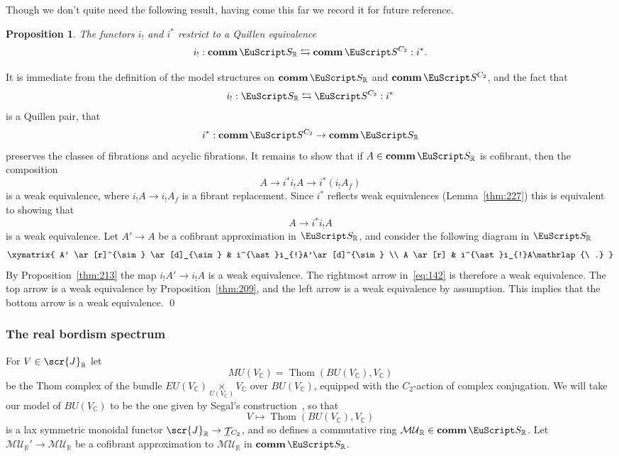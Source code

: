 \documentclass{amsart}
\newtheorem{prop}[equation]{Proposition}
\theoremstyle{definition}
\theoremstyle{remark}
\newenvironment{pf}{\bigskip{\em Proof:\/}}{\qed\medskip}
\newcommand{\R}{{\mathbb R}}
\newcommand{\C}{\mathbb C}
\newcommand{\spectra}{\EuScript S}
\newcommand{\MUR}{\mathcal{MU}_{\R}}
\DeclareMathOperator{\spaces}{\mathcal T}
\DeclareMathOperator{\thom}{Thom}
\newcommand{\icat}{\scr{J}}
\newcommand{\gspaces}[1]{\underline{\spaces\mkern-4mu}\mkern4mu_{\!#1}}
\newcommand{\ugspectra}[1]{\spectra^{#1}}
\newcommand{\zt}{C_{2}}
\DeclareMathOperator{\comm}{\mathbf{comm}}
\newcommand{\icatr}{\icat_{\R}}
\newcommand{\rspectra}{\spectra_{\R}}
\begin{document}
Though we don't quite need the following result, having come this far
we record it for future reference.

\begin{prop}
\label{thm:219}
The functors $i_{!}$ and $i^{\ast}$ restrict to a Quillen equivalence 
\[
i_{!}:\comm\rspectra\leftrightarrows \comm\ugspectra{\zt}:i^{\ast}.
\]
\end{prop}

\begin{pf}
It is immediate from the definition of the model structures on 
$\comm\rspectra$ and $\comm \ugspectra{\zt}$, and the fact that 
\[
i_{!}:\rspectra\leftrightarrows \ugspectra{\zt}:i^{\ast}
\]
is a Quillen pair, that 
\[
i^{\ast}:\comm\ugspectra{\zt}\to \comm\rspectra
\]
preserves the classes of fibrations and acyclic fibrations.    It
remains to show that if $A\in \comm\rspectra$ is cofibrant, then the
composition
\[
A \to i^{\ast} i_{!}A \to i^{\ast}(i_{!}A_{f})
\]
is a weak equivalence, where $i_{!}A \to i_{!}A_{f}$ is a fibrant
replacement.  Since $i^{\ast}$ reflects weak equivalences
(Lemma~\ref{thm:227}) this is equivalent to showing that
\[
A\to i^{\ast}i_{!}A
\]
is a weak equivalence.   Let $A'\to A$ be a cofibrant
approximation in $\rspectra$, and consider the following diagram in
$\rspectra$
\begin{equation}
\label{eq:142}
\xymatrix{
A' \ar[r]^{\sim} \ar[d]_{\sim} & i^{\ast}i_{!}A'\ar[d]^{\sim} \\
A \ar[r] & i^{\ast}i_{!}A\mathrlap{\ .}
}
\end{equation}
By Proposition~\ref{thm:213} the map $i_{!}A'\to i_{!}A$ is a weak
equivalence.  The rightmost arrow in~\eqref{eq:142} is therefore a
weak equivalence.  The top arrow is a weak equivalence by
Proposition~\ref{thm:209}, and the left arrow is a weak equivalence by
assumption.  This implies that the bottom arrow is a weak equivalence.
\end{pf}

\subsubsection{The real bordism spectrum}
\label{sec:real-bord-spectr}

For $V\in\icatr$ let 
\[
MU(V_{\C})=\thom(BU(V_{\C}),V_{\C})
\]
be the Thom complex of the bundle
$EU(V_{\C})\underset{U(V_{\C})}\times V_{\C}$ over $BU(V_{\C})$,
equipped with the $\zt$-action of complex conjugation.  We will take
our model of $BU(V_{\C})$ to be the one given by Segal's
construction~\cite{Segal:CSandSS}, so that
\begin{equation}
\label{eq:109}
V\mapsto \thom(BU(V_{\C}),V_{\C})
\end{equation}
is a lax symmetric monoidal functor $\icatr \to \gspaces{\zt}$, and so
defines a commutative ring $\MUR\in\comm\rspectra$.  Let $\MUR'\to
\MUR$ be a cofibrant approximation to $\MUR$ in $\comm\rspectra$.
\end{document}
